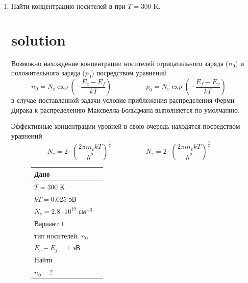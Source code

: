 \documentclass[12pt,a4paper]{article}
\theoremstyle{plain}
\theoremstyle{definition}
\theoremstyle{remark}
\numberwithin{equation}{section}
\begin{document}
\begin{enumerate}
    \pagebreak

    \item Найти концентрацию носителей в  при $T=300$ K.
    
    \section*{solution}

    \quad Возможно нахождение концентрации носителей отрицательного заряда ($n_0$) и 
    положительного заряда ($p_0$) посредством уравнений
    \begin{equation*}
        n_0 = N_c \exp{\left(-\frac{E_c-E_f}{kT}\right)} 
        \hspace{5em} 
        p_0 = N_v \exp{\left(-\frac{E_f-E_v}{kT}\right)}
    \end{equation*}
    в случае поставленной задачи условие приблежения распределения Ферми-Дирака к 
    распределению Максвелла-Больцмана выполняется по умолчанию.

    \quad Эффективные концентрации уровней в свою очередь находятся посредством 
    уравнений
    \begin{equation*}
        N_c = 2 \cdot \left(\frac{2\pi m_c kT}{h^2}\right)^{\frac{3}{2}}
        \hspace{5em}
        N_v = 2 \cdot \left(\frac{2\pi m_v kT}{h^2}\right)^{\frac{3}{2}}
    \end{equation*}

    \begin{figure}[H]
        \hspace{2em}
        \begin{minipage}[t]{0.3\textwidth}
            \vspace{0em}
            \begin{tabularx}{\linewidth}{|X|X|}
                \hline
                Дано \\
                \hline
                $T = 300$ К \\
                $kT = 0.025$ эВ \\
                $N_c = 2.8 \cdot 10^{19}$ см$^{-3}$ \\
                \hline
                Вариант $1$ \\
                \hline
                тип носителей: $n_0$ \\
                $E_c - E_f = 1$ эВ \\
                \hline
                Найти \\
                \hline
                $n_0 - ?$ \\
                \hline
            \end{tabularx}


\end{minipage}
\end{figure}
\end{enumerate}
\end{document}
